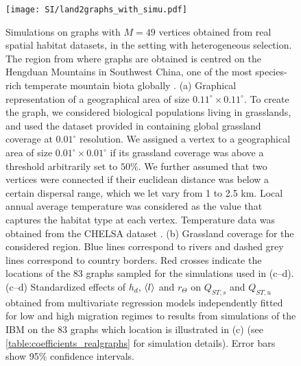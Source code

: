 \begin{figure}[!ht]
  \centerline{
      \texttt{[image: SI/land2graphs\_with\_simu.pdf]} 
  }
  \caption{\small Simulations on graphs with $M=49$ vertices obtained from real spatial habitat datasets, in the setting with heterogeneous selection. The region from where graphs are obtained is centred on the Hengduan Mountains in Southwest China, one of the most species-rich temperate mountain biota globally \cite{Ding2020a}.
  (a) Graphical representation of a geographical area of size $ 0.11^{\circ} \times 0.11^{\circ}$. To create the graph, we considered biological populations living in grasslands, and used the dataset provided in \cite{Jung2020} containing global grassland coverage at $0.01^\circ$ resolution. We assigned a vertex to a geographical area of size $ 0.01^{\circ} \times 0.01^{\circ}$ if its grassland coverage was above a threshold arbitrarily set to $50\%$. We further assumed that two vertices were connected if their euclidean distance was below a certain dispersal range, which we let vary from 1 to 2.5 km. Local annual average temperature was considered as the value that captures the habitat type at each vertex. Temperature data was obtained from the CHELSA dataset \cite{Karger2017}.
  (b) Grassland coverage for the considered region. Blue lines correspond to rivers and dashed grey lines correspond to country borders. Red crosses indicate the locations of the 83 graphs sampled for the simulations used in (c--d).
  (c--d) Standardized effects of $h_d$, $\langle l \rangle$ and $r_\Theta$ on $Q_{ST,s}$ and $Q_{ST,u}$ obtained from multivariate regression models independently fitted for low and high migration regimes to results from simulations of the IBM on the 83 graphs which location is illustrated in (c) (see \cref{table:coefficients_realgraphs} for simulation details). Error bars show 95\% confidence intervals.}
  \label{figSI:graph_real_land}
\end{figure}
\FloatBarrier



